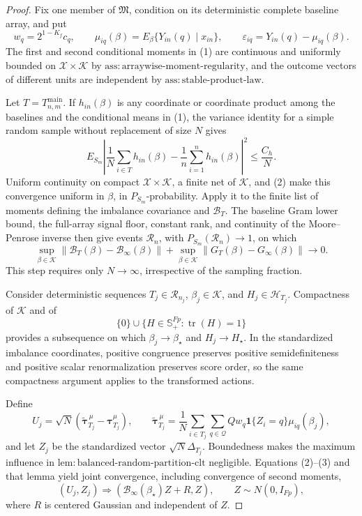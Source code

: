 \documentclass{article}
\begin{document}
\begin{proof}
Fix one member of \(\mathfrak M\), condition on its deterministic complete baseline array, and put
\[
w_q=2^{1-K_f}c_q,
\qquad
\mu_{iq}(\beta)=E_\beta\{Y_{in}(q)\mid x_{in}\},
\qquad
\varepsilon_{iq}=Y_{in}(q)-\mu_{iq}(\beta).
\tag{1}
\]
The first and second conditional moments in (1) are continuous and uniformly bounded on \(\mathcal X\times\mathcal K\) by \(\mathrm{ass{:}arraywise\text{-}moment\text{-}regularity}\), and the outcome vectors of different units are independent by \(\mathrm{ass{:}stable\text{-}product\text{-}law}\).

Let \(T=T_{n,m}^{\mathrm{main}}\).  If \(h_{in}(\beta)\) is any coordinate or coordinate product among the baselines and the conditional means in (1), the variance identity for a simple random sample without replacement of size \(N\) gives
\[
E_{S_m}\left|
\frac1N\sum_{i\in T}h_{in}(\beta)
-\frac1n\sum_{i=1}^nh_{in}(\beta)
\right|^2\leq\frac{C_h}{N}.
\tag{2}
\]
Uniform continuity on compact \(\mathcal X\times\mathcal K\), a finite net of \(\mathcal K\), and (2) make this convergence uniform in \(\beta\), in \(P_{S_m}\)-probability.  Apply it to the finite list of moments defining the imbalance covariance and \(\mathcal B_T\).  The baseline Gram lower bound, the full-array signal floor, constant rank, and continuity of the Moore--Penrose inverse then give events \(\mathcal R_n\), with \(P_{S_m}(\mathcal R_n)\to1\), on which
\[
\sup_{\beta\in\mathcal K}
\left\|\mathcal B_T(\beta)-\mathcal B_\infty(\beta)\right\|
+
\sup_{\beta\in\mathcal K}
\left\|G_T(\beta)-G_\infty(\beta)\right\|
\longrightarrow0.
\tag{3}
\]
This step requires only \(N\to\infty\), irrespective of the sampling fraction.

Consider deterministic sequences \(T_j\in\mathcal R_{n_j}\), \(\beta_j\in\mathcal K\), and \(H_j\in\mathcal H_{T_j}\).  Compactness of \(\mathcal K\) and of
\[
\{0\}\cup\{H\in\mathbb S_+^{Fp}:\operatorname{tr}(H)=1\}
\tag{4}
\]
provides a subsequence on which \(\beta_j\to\beta_\star\) and \(H_j\to H_\star\).  In the standardized imbalance coordinates, positive congruence preserves positive semidefiniteness and positive scalar renormalization preserves score order, so the same compactness argument applies to the transformed actions.

Define
\[
U_j=\sqrt N\left(
\widetilde{\boldsymbol\tau}^{\,\mu}_{T_j}
-\boldsymbol\tau_{T_j}^{\mu}\right),
\qquad
\widetilde{\boldsymbol\tau}^{\,\mu}_{T_j}
=\frac1N\sum_{i\in T_j}\sum_{q\in\mathcal Q}
Qw_q\mathbf 1\{Z_i=q\}\mu_{iq}(\beta_j),
\tag{5}
\]
and let \(Z_j\) be the standardized vector \(\sqrt N\Delta_{T_j}\).  Boundedness makes the maximum influence in \(\mathrm{lem{:}balanced\text{-}random\text{-}partition\text{-}clt}\) negligible.  Equations (2)--(3) and that lemma yield joint convergence, including convergence of second moments,
\[
(U_j,Z_j)\Rightarrow
(\mathcal B_\infty(\beta_\star)Z+R,Z),
\qquad Z\sim N(0,I_{Fp}),
\tag{6}
\]
where \(R\) is centered Gaussian and independent of \(Z\).


\end{proof}
\end{document}
